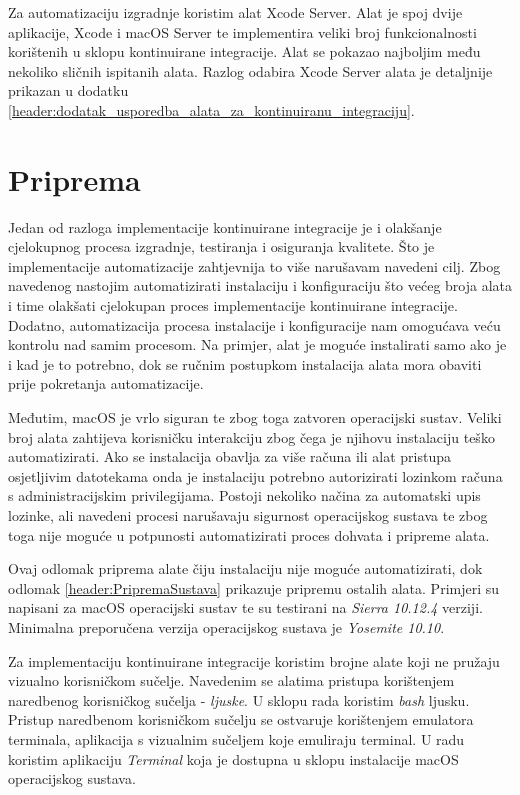 \documentclass[times, utf8, diplomski, numeric]{fer}
\begin{document}
Za automatizaciju izgradnje koristim alat Xcode Server. Alat je spoj dvije aplikacije, Xcode i macOS Server te implementira veliki broj funkcionalnosti korištenih u sklopu kontinuirane integracije. Alat se pokazao najboljim među nekoliko sličnih ispitanih alata. Razlog odabira Xcode Server alata je detaljnije prikazan u dodatku \ref{header:dodatak_usporedba_alata_za_kontinuiranu_integraciju}.

\section{Priprema}

Jedan od razloga implementacije kontinuirane integracije je i olakšanje cjelokupnog procesa izgradnje, testiranja i osiguranja kvalitete. Što je implementacije automatizacije zahtjevnija to više narušavam navedeni cilj. Zbog navedenog nastojim automatizirati instalaciju i konfiguraciju što većeg broja alata i time olakšati cjelokupan proces implementacije kontinuirane integracije. Dodatno, automatizacija procesa instalacije i konfiguracije nam omogućava veću kontrolu nad samim procesom. Na primjer, alat je moguće instalirati samo ako je i kad je to potrebno, dok se ručnim postupkom instalacija alata mora obaviti prije pokretanja automatizacije.

Međutim, macOS je vrlo siguran te zbog toga zatvoren operacijski sustav. Veliki broj alata zahtijeva korisničku interakciju zbog čega je njihovu instalaciju teško automatizirati. Ako se instalacija obavlja za više računa ili alat pristupa osjetljivim datotekama onda je instalaciju potrebno autorizirati lozinkom računa s administracijskim privilegijama. Postoji nekoliko načina za automatski upis lozinke, ali navedeni procesi narušavaju sigurnost operacijskog sustava te zbog toga nije moguće u potpunosti automatizirati proces dohvata i pripreme alata.

Ovaj odlomak priprema alate čiju instalaciju nije moguće automatizirati, dok odlomak \ref{header:PripremaSustava} prikazuje pripremu ostalih alata. Primjeri su napisani za macOS operacijski sustav te su testirani na \textit{Sierra 10.12.4} verziji. Minimalna preporučena verzija operacijskog sustava je \textit{Yosemite 10.10}.

Za implementaciju kontinuirane integracije koristim brojne alate koji ne pružaju vizualno korisničkom sučelje. Navedenim se alatima pristupa korištenjem naredbenog korisničkog sučelja - \textit{ljuske}. U sklopu rada koristim \textit{bash} ljusku. Pristup naredbenom korisničkom sučelju se ostvaruje korištenjem emulatora terminala, aplikacija s vizualnim sučeljem koje emuliraju terminal. U radu koristim aplikaciju \textit{Terminal} koja je dostupna u sklopu instalacije macOS operacijskog sustava.
\end{document}
